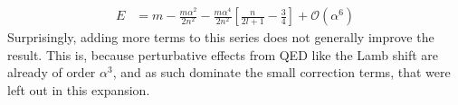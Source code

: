 \documentclass[english, parskip=full]{scrartcl}
\newcommand{\kla}{}
\newcommand{\klam}{}
\begin{document}
\begin{align*}
E&=m-\frac{m\alpha^2}{2n^2}-\frac{m\alpha^4}{2n^2}\klam\left[ {\frac{n}{2l+1}-\frac{3}{4}} \right]+\mathcal{O}(\alpha^6)
\end{align*}
Surprisingly, adding more terms to this series does not generally improve the result. This is, because perturbative effects from QED like the Lamb shift are already of order $\alpha^3$, and as such dominate the small correction terms, that were left out in this expansion.

\end{document}
